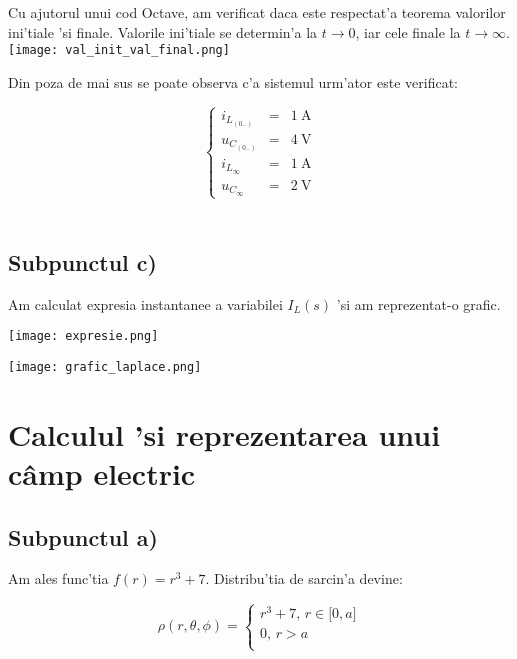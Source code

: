 \documentclass[titlepage, a4paper,12pt]{article}
\begin{document}
Cu ajutorul unui cod Octave, am verificat daca este respectat'a teorema valorilor ini'tiale 'si finale. Valorile ini'tiale se determin'a la $t \rightarrow 0$, iar cele finale la $t \rightarrow \infty$. \\

\texttt{[image: val\_init\_val\_final.png]}

Din poza de mai sus se poate observa c'a sistemul urm'ator este verificat:

\begin{equation}
\left\{
\begin{array}{ccl}
i_{L_{(0_-)}} & = & \SI{1}{\ampere} \\
u_{C_{(0_-)}} & = & \SI{4}{\volt} \\
i_{L_{\infty}} & = & \SI{1}{\ampere} \\
u_{C_{\infty}} & = & \SI{2}{\volt}
\end{array}  
\right. \nonumber %
\end{equation} \\

\subsection{Subpunctul c)} \mbox{}

Am calculat expresia instantanee a variabilei $I_L(s)$ 'si am reprezentat-o grafic.

\begin{center}
\texttt{[image: expresie.png]}
\end{center}

\begin{center}
\texttt{[image: grafic\_laplace.png]}
\end{center}

\section{Calculul 'si reprezentarea unui c\^amp electric} \mbox{}

\subsection{Subpunctul a)} \mbox{}

Am ales func'tia $f(r)=r^3+7$. Distribu'tia de sarcin'a devine:

\[   
\rho(r, \theta, \phi) = 
     \begin{cases}
       \text{$r^3+7$, $r \in \big[0,a\big]$} \\
       \text{0, $r>a$} \\
     \end{cases}
\]\\
\end{document}
